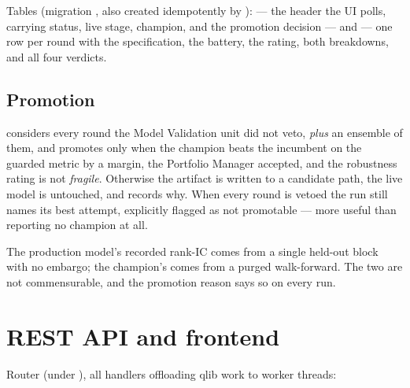 \documentclass[11pt]{article}
\begin{document}
Tables (migration , also created idempotently by
):  --- the header the
UI polls, carrying status, live stage, champion, and the promotion decision --- and
 --- one row per round with the specification,
the battery, the rating, both breakdowns, and all four verdicts.

\subsection{Promotion}

 considers every round the Model Validation unit did not veto,
\emph{plus} an ensemble of them, and promotes only when the champion beats the
incumbent on the guarded metric by a margin, the Portfolio Manager accepted, and the
robustness rating is not \emph{fragile}. Otherwise the artifact is written to a
candidate path, the live model is untouched, and  records
why. When every round is vetoed the run still names its best attempt, explicitly
flagged as not promotable --- more useful than reporting no champion at all.

\begin{notebox}
The production model's recorded rank-IC comes from a single held-out block with no
embargo; the champion's comes from a purged walk-forward. The two are not
commensurable, and the promotion reason says so on every run.
\end{notebox}

\section{REST API and frontend}
Router  (under ), all handlers
offloading qlib work to worker threads:
\end{document}

